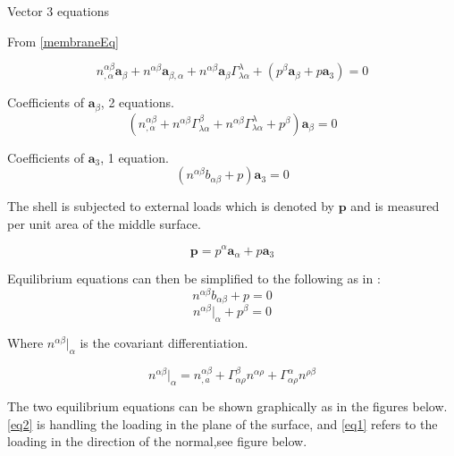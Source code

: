 Vector 3 equations

From \ref{membraneEq}

\begin{equation}
n^{\alpha \beta}_{,\alpha} \textbf{a}_\beta + n^{\alpha \beta}\textbf{a}_{\beta,\alpha} + n^{\alpha \beta}\textbf{a}_\beta \Gamma^\lambda_{\lambda \alpha} + (p^\beta \textbf{a}_\beta + p\textbf{a}_3) = 0
\end{equation}

Coefficients of $\textbf{a}_\beta$,  2 equations.
\begin{equation}
(n^{\alpha \beta}_{,\alpha} + n^{\alpha \beta}\Gamma^\beta_{\lambda \alpha} + n^{\alpha \beta}\Gamma^\lambda_{\lambda \alpha} + p^\beta) \textbf{a}_\beta = 0 
\end{equation}

Coefficients of $\textbf{a}_3$,  1 equation.
\begin{equation}
(n^{\alpha \beta} b_{\alpha \beta} + p)\textbf{a}_3 = 0
\end{equation}

The shell is subjected to external loads which is denoted by $\textbf{p}$ and is measured per unit area of the middle surface.

\begin{equation}
\textbf{p} = p^{\alpha}\textbf{a}_\alpha +p\textbf{a}_3
\end{equation}


Equilibrium equations can then be simplified to the following as in \cite{ref:GreenZerna}:
\begin{equation} \label{eq1}
n^{\alpha \beta}b_{\alpha \beta} + p = 0
\end{equation}
\begin{equation}\label{eq2}
n^{\alpha \beta}|_\alpha + p^\beta = 0
\end{equation}

Where $n^{\alpha \beta}|_\alpha$ is the covariant differentiation. 

\begin{equation}
n^{\alpha \beta}|_\alpha = n^{\alpha \beta}_{,a} + \Gamma^\beta_{\alpha \rho} n^{\alpha \rho} + \Gamma^\alpha_{\alpha \rho} n^{\rho \beta}
\end{equation}

The two equilibrium equations can be shown graphically as in the figures below.\ref{eq2} is handling the loading in the plane of the surface, and \ref{eq1} refers to the loading in the direction of the normal,see figure below.

